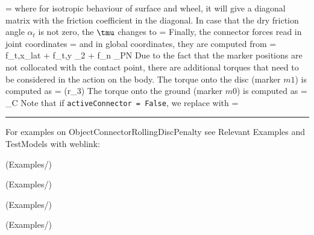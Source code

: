     \be
       = 
    \ee
    where for isotropic behaviour of surface and wheel, it will give a diagonal matrix with the friction coefficient in the diagonal.
    In case that the dry friction angle $\alpha_t$ is not zero, the $\tmu$ changes to
    \be
       =  
    \ee
    Finally, the connector forces read in joint coordinates
    \be \label{eq:ConnectorRollingDiscPenalty:forces}
       = 
    \ee
    and in global coordinates, they are computed from
    \be
       = f_{t,x}_{lat} + f_{t,y} _2 + f_n _{PN}
    \ee
    Due to the fact that the marker positions are not collocated with the contact point, 
    there are additional torques that need to be considered in the action on the body.
    The torque onto the disc (marker $m1$) is computed as
    \be
       = (r\cdot {}_3) \times {}
    \ee
    The torque onto the ground (marker $m0$) is computed as
    \be
       = _{C} \times {}
    \ee
    Note that if \texttt{activeConnector = False}, we replace  with
    \be
       = \Null
    \ee
\vspace{6pt}\par\noindent\rule{\textwidth}{0.4pt}
%
\noindent For examples on ObjectConnectorRollingDiscPenalty see Relevant Examples and TestModels with weblink:
\bi
\item {} (Examples/)
\item {} (Examples/)
\item {} (Examples/)
\item {} (Examples/)
